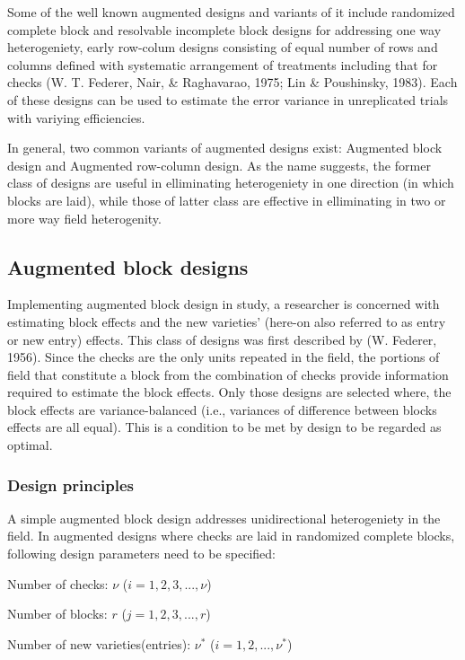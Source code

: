 \documentclass[12pt,oneside]{dukestatscithesis} %
\theoremstyle{definition}
\theoremstyle{definition}
\theoremstyle{definition}
\theoremstyle{remark}
\begin{document}
Some of the well known augmented designs and variants of it include
randomized complete block and resolvable incomplete block designs for
addressing one way heterogeniety, early row-colum designs consisting of
equal number of rows and columns defined with systematic arrangement of
treatments including that for checks (W. T. Federer, Nair, \&
Raghavarao, 1975; Lin \& Poushinsky, 1983). Each of these designs can be
used to estimate the error variance in unreplicated trials with variying
efficiencies.

In general, two common variants of augmented designs exist: Augmented
block design and Augmented row-column design. As the name suggests, the
former class of designs are useful in elliminating heterogeniety in one
direction (in which blocks are laid), while those of latter class are
effective in elliminating in two or more way field heterogenity.

\subsection{Augmented block designs}\label{aug-block-des}

Implementing augmented block design in study, a researcher is concerned
with estimating block effects and the new varieties' (here-on also
referred to as entry or new entry) effects. This class of designs was
first described by (W. Federer, 1956). Since the checks are the only
units repeated in the field, the portions of field that constitute a
block from the combination of checks provide information required to
estimate the block effects. Only those designs are selected where, the
block effects are variance-balanced (i.e., variances of difference
between blocks effects are all equal). This is a condition to be met by
design to be regarded as optimal.

\subsubsection{Design principles}\label{des-prin-aug-block}

A simple augmented block design addresses unidirectional heterogeniety
in the field. In augmented designs where checks are laid in randomized
complete blocks, following design parameters need to be specified:

Number of checks: \(\nu\) (\(i = 1, 2, 3,..., \nu\))

Number of blocks: \(r\) (\(j = 1, 2, 3,..., r\))

Number of new varieties(entries): \(\nu^*\) (\(i = 1, 2,..., \nu^*\))
\end{document}
